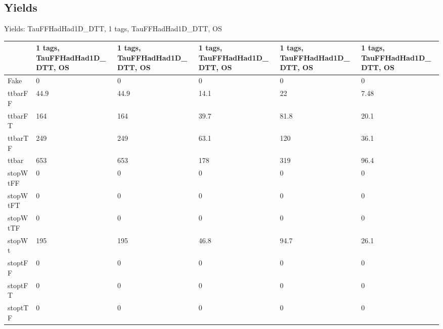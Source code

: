 
\subsection{Yields}

\begin{frame}{Yields: TauFFHadHad1D\_DTT, 1 tags, TauFFHadHad1D\_DTT, OS}
\begin{center}
  \begin{tabular}{l| >{\centering\let\newline\\\arraybackslash\hspace{0pt}}m{1.4cm}| >{\centering\let\newline\\\arraybackslash\hspace{0pt}}m{1.4cm}| >{\centering\let\newline\\\arraybackslash\hspace{0pt}}m{1.4cm}| >{\centering\let\newline\\\arraybackslash\hspace{0pt}}m{1.4cm}| >{\centering\let\newline\\\arraybackslash\hspace{0pt}}m{1.4cm}}
    & 1 tags, TauFFHadHad1D\_DTT, OS & 1 tags, TauFFHadHad1D\_DTT, OS & 1 tags, TauFFHadHad1D\_DTT, OS & 1 tags, TauFFHadHad1D\_DTT, OS & 1 tags, TauFFHadHad1D\_DTT, OS \\
 \hline \hline
    Fake& 0 & 0 & 0 & 0 & 0 \\
 \hline
    ttbarFF& 44.9 & 44.9 & 14.1 & 22 & 7.48 \\
 \hline
    ttbarFT& 164 & 164 & 39.7 & 81.8 & 20.1 \\
 \hline
    ttbarTF& 249 & 249 & 63.1 & 120 & 36.1 \\
 \hline
    ttbar& 653 & 653 & 178 & 319 & 96.4 \\
 \hline
    stopWtFF& 0 & 0 & 0 & 0 & 0 \\
 \hline
    stopWtFT& 0 & 0 & 0 & 0 & 0 \\
 \hline
    stopWtTF& 0 & 0 & 0 & 0 & 0 \\
 \hline
    stopWt& 195 & 195 & 46.8 & 94.7 & 26.1 \\
 \hline
    stoptFF& 0 & 0 & 0 & 0 & 0 \\
 \hline
    stoptFT& 0 & 0 & 0 & 0 & 0 \\
 \hline
    stoptTF& 0 & 0 & 0 & 0 & 0 \\

\end{tabular}
\end{center}
\end{frame}
